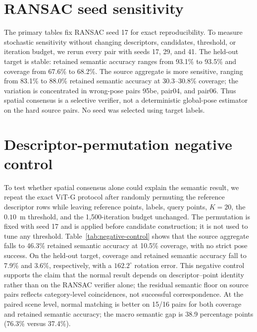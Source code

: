 \documentclass[10pt,twocolumn]{article}
\begin{document}
\begin{table}[t]
\centering
\scriptsize
\resizebox{\columnwidth}{!}{}
\caption{Clean top-$K$ sensitivity. Source metrics are weighted over 16
pairs; target metrics are the held-out point estimate.}
\label{tab:k-sweep}
\end{table}

\section{RANSAC seed sensitivity}

The primary tables fix RANSAC seed 17 for exact reproducibility. To measure
stochastic sensitivity without changing descriptors, candidates, threshold, or
iteration budget, we rerun every pair with seeds 17, 29, and 41. The held-out
target is stable: retained semantic accuracy ranges from 93.1\% to 93.5\% and
coverage from 67.6\% to 68.2\%. The source aggregate is more sensitive,
ranging from 83.1\% to 88.0\% retained semantic accuracy at 30.3--30.8\% coverage;
the variation is concentrated in wrong-pose pairs 95be, pair04, and pair06.
Thus spatial consensus is a selective verifier, not a deterministic global-pose
estimator on the hard source pairs. No seed was selected using target labels.

\begin{table}[t]
\centering
\scriptsize
\resizebox{\columnwidth}{!}{}
\caption{RANSAC seed sensitivity with fixed candidates and budget.}
\label{tab:seed-sweep}
\end{table}

\section{Descriptor-permutation negative control}

To test whether spatial consensus alone could explain the semantic result, we
repeat the exact ViT-G protocol after randomly permuting the reference
descriptor rows while leaving reference points, labels, query points, $K=20$,
the $0.10$~m threshold, and the 1,500-iteration budget unchanged. The
permutation is fixed with seed 17 and is applied before candidate construction;
it is not used to tune any threshold. Table~\ref{tab:negative-control} shows
that the source aggregate falls to 46.3\% retained semantic accuracy at 10.5\%
coverage, with no strict pose success. On the held-out target, coverage and
retained semantic accuracy fall to 7.9\% and 3.6\%, respectively, with a
$162.2^\circ$ rotation error. This negative control supports the claim that
the normal result depends on descriptor--point identity rather than on the
RANSAC verifier alone; the residual semantic floor on source pairs reflects
category-level coincidences, not successful correspondence.
At the paired scene level, normal matching is better on 15/16 pairs for both
coverage and retained semantic accuracy; the macro semantic gap is 38.9 percentage
points (76.3\% versus 37.4\%).
\end{document}
